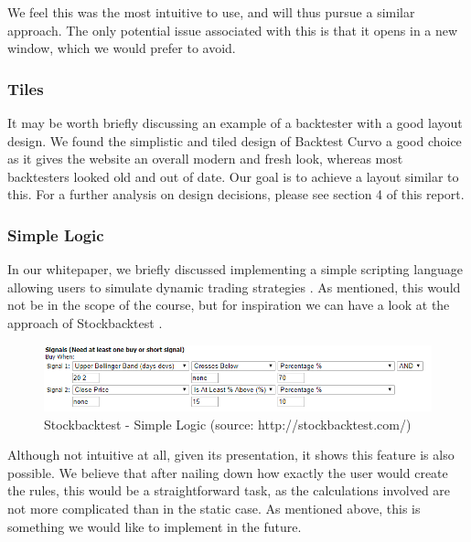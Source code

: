 \documentclass[main.tex]{subfiles}
\begin{document}
We feel this was the most intuitive to use, and will thus pursue a similar approach. The only potential issue associated with this is that it opens in a new window, which we would prefer to avoid.

\subsubsection*{Tiles}

It may be worth briefly discussing an example of a backtester with a good layout design. We found the simplistic and tiled design of Backtest Curvo \cite{backtestcurvo} a good choice as it gives the website an overall modern and fresh look, whereas most backtesters looked old and out of date. Our goal is to achieve a layout similar to this. For a further analysis on design decisions, please see section 4 of this report.

\subsubsection*{Simple Logic}

In our whitepaper, we briefly discussed implementing a simple scripting language allowing users to simulate dynamic trading strategies \cite{WP}. As mentioned, this would not be in the scope of the course, but for inspiration we can have a look at the approach of Stockbacktest \cite{stockbacktest}.

\begin{figure}[H]
   \centering
   \includegraphics[scale=0.7]{02Background/02Pictures/stockbacktest.png}
   \caption{Stockbacktest - Simple Logic (source: http://stockbacktest.com/)}
\end{figure}

Although not intuitive at all, given its presentation, it shows this feature is also possible. We believe that after nailing down how exactly the user would create the rules, this would be a straightforward task, as the calculations involved are not more complicated than in the static case. As mentioned above, this is something we would like to implement in the future.
\end{document}
